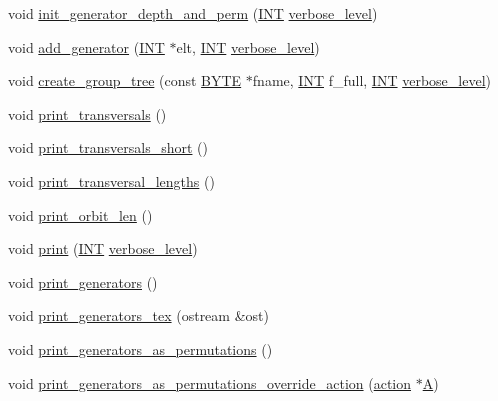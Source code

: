 \begin{DoxyCompactItemize}
\item 
void \mbox{\hyperlink{classsims_af8c21505bf172665ba503cf3138f38cd}{init\+\_\+generator\+\_\+depth\+\_\+and\+\_\+perm}} (\mbox{\hyperlink{galois_8h_a09fddde158a3a20bd2dcadb609de11dc}{I\+NT}} \mbox{\hyperlink{simeon_8_c_a818073fbcc2f439e7c56952f67386122}{verbose\+\_\+level}})
\item 
void \mbox{\hyperlink{classsims_add28c3fa3ed9825c7ccb4b1fb7ac22d4}{add\+\_\+generator}} (\mbox{\hyperlink{galois_8h_a09fddde158a3a20bd2dcadb609de11dc}{I\+NT}} $\ast$elt, \mbox{\hyperlink{galois_8h_a09fddde158a3a20bd2dcadb609de11dc}{I\+NT}} \mbox{\hyperlink{simeon_8_c_a818073fbcc2f439e7c56952f67386122}{verbose\+\_\+level}})
\item 
void \mbox{\hyperlink{classsims_a10ac0f054b6366025465e6775cb9983a}{create\+\_\+group\+\_\+tree}} (const \mbox{\hyperlink{galois_8h_ab6cc7b4aeb6ea31aba2b3fbfc83ff5e6}{B\+Y\+TE}} $\ast$fname, \mbox{\hyperlink{galois_8h_a09fddde158a3a20bd2dcadb609de11dc}{I\+NT}} f\+\_\+full, \mbox{\hyperlink{galois_8h_a09fddde158a3a20bd2dcadb609de11dc}{I\+NT}} \mbox{\hyperlink{simeon_8_c_a818073fbcc2f439e7c56952f67386122}{verbose\+\_\+level}})
\item 
void \mbox{\hyperlink{classsims_a77dbb9429e40ca83098f314bf0e3c44a}{print\+\_\+transversals}} ()
\item 
void \mbox{\hyperlink{classsims_a817d3d28dddde6291dd166eed121057e}{print\+\_\+transversals\+\_\+short}} ()
\item 
void \mbox{\hyperlink{classsims_a122d9276cad4b4fbb8ea6f7831d43020}{print\+\_\+transversal\+\_\+lengths}} ()
\item 
void \mbox{\hyperlink{classsims_aafae664e1594cffd4317cf881748cf0b}{print\+\_\+orbit\+\_\+len}} ()
\item 
void \mbox{\hyperlink{classsims_a93c3d22dc3ac6d78acc60bad65234944}{print}} (\mbox{\hyperlink{galois_8h_a09fddde158a3a20bd2dcadb609de11dc}{I\+NT}} \mbox{\hyperlink{simeon_8_c_a818073fbcc2f439e7c56952f67386122}{verbose\+\_\+level}})
\item 
void \mbox{\hyperlink{classsims_a49dfebd7ef9b23cb3c1264bc462f2233}{print\+\_\+generators}} ()
\item 
void \mbox{\hyperlink{classsims_ab1db48a4211b1bc26bf45af9f38b1613}{print\+\_\+generators\+\_\+tex}} (ostream \&ost)
\item 
void \mbox{\hyperlink{classsims_ae46e51d796b88c621c497fc1cb7cf90e}{print\+\_\+generators\+\_\+as\+\_\+permutations}} ()
\item 
void \mbox{\hyperlink{classsims_adead6abd4ac7a6a90073271c4fee5671}{print\+\_\+generators\+\_\+as\+\_\+permutations\+\_\+override\+\_\+action}} (\mbox{\hyperlink{classaction}{action}} $\ast$\mbox{\hyperlink{classsims_a3311c97dc08837220191985b1c7ee73f}{A}})

\end{DoxyCompactItemize}
